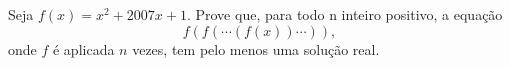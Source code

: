 Seja $f(x) = x^2 + 2007x + 1$. Prove que, para todo n inteiro positivo, a equação
$$f(f(\cdots(f(x))\cdots)),$$
onde $f$ é aplicada $n$ vezes, tem pelo menos uma solução real.
